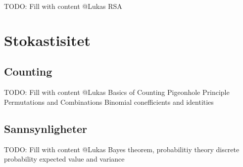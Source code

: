 \begin{frame}
TODO: Fill with content @Lukas 
RSA
\end{frame}

\section{Stokastisitet}
\subsection{Counting}
\begin{frame}
TODO: Fill with content @Lukas 
Basics of Counting
Pigeonhole Principle
Permutations and Combinations
Binomial conefficients and identities
\end{frame}

\subsection{Sannsynligheter}
\begin{frame}
TODO: Fill with content @Lukas 
Bayes theorem, probabilitiy theory
discrete probability
expected value and variance
\end{frame}


